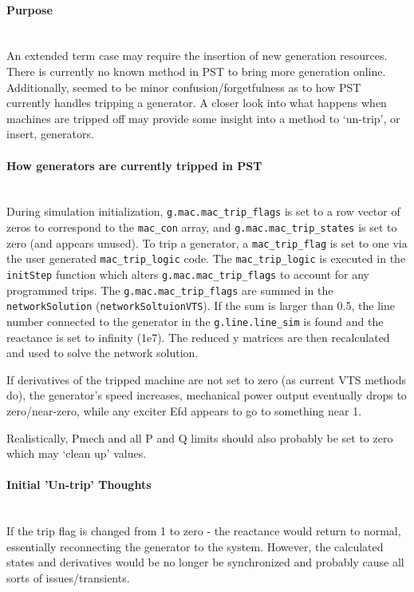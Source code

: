 \documentclass[12pt]{article}
\begin{document}
\onehalfspacing
\paragraph{Purpose} \ \\
An extended term case may require the insertion of new generation resources.
There is currently no known method in PST to bring more generation online.
Additionally, seemed to be minor confusion/forgetfulness as to how PST currently handles tripping a generator.
A closer look into what happens when machines are tripped off may provide some insight into a method to `un-trip', or insert, generators.


\paragraph{How generators are currently tripped in PST} \ \\
During simulation initialization, \verb|g.mac.mac_trip_flags| is set to a row vector of zeros to correspond to the \verb|mac_con| array, and 
\verb|g.mac.mac_trip_states| is set to zero (and appears unused).
To trip a generator, a \verb|mac_trip_flag| is set to one via the user generated \verb|mac_trip_logic| code.
The \verb|mac_trip_logic| is executed in the \verb|initStep| function which alters \verb|g.mac.mac_trip_flags| to account for any programmed trips.
The \verb|g.mac.mac_trip_flags| are summed in the \verb|networkSolution| (\verb|networkSoltuionVTS|).
If the sum is larger than 0.5, the line number connected to the generator in the \verb|g.line.line_sim| is found and the reactance is set to infinity (1e7).
The reduced y matrices are then recalculated and used to solve the network solution.

If derivatives of the tripped machine are not set to zero (as current VTS methods do), the generator's speed increases, mechanical power output eventually drops to zero/near-zero, while any exciter Efd appears to go to something near 1.

Realistically, Pmech and all P and Q limits should also probably be set to zero which may `clean up' values.


\pagebreak
\paragraph{Initial 'Un-trip' Thoughts} \ \\
If the trip flag is changed from 1 to zero - the reactance would return to normal, essentially reconnecting the generator to the system.
However, the calculated states and derivatives would be no longer be synchronized and probably cause all sorts of issues/transients.
\end{document}
